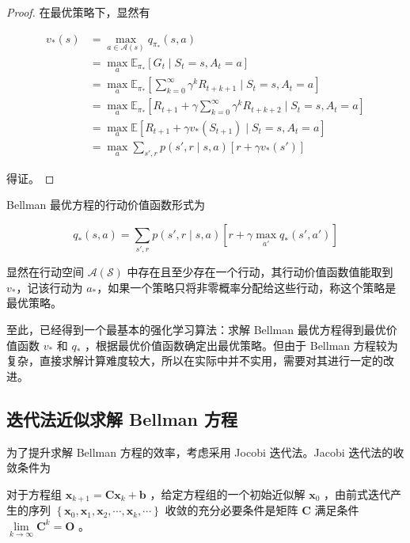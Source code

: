 \begin{proof}
    在最优策略下，显然有

     \[
    \begin{aligned}v_*(s) &= \max_{a\in \mathcal A(s)}q_{\pi_*}(s,a) \\ &=\max_a \mathbb{E}_{\pi_*} \left[G_t \mid S_t=s, A_t=a \right] \\ &= \max_a \mathbb{E}_{\pi_*} \left[\sum_{k=0}^\infty \gamma^kR_{t+k+1} \mid S_t=s,A_t=a \right] \\ &= \max_a \mathbb{E}_{\pi_*} \left[R_{t+1}+\gamma \sum_{k=0}^\infty\gamma^kR_{t+k+2}\mid S_t=s,A_t=a \right] \\ &= \max_a \mathbb{E}[R_{t+1}+\gamma v_*(S_{t+1}) \mid S_t=s,A_t=a] \\ &=\max_{a}\sum_{s',r}p(s',r \mid s,a)[r+\gamma v_*(s')]\end{aligned}
    \]

    得证。
\end{proof}

Bellman 最优方程的行动价值函数形式为

\begin{equation}
    q_*(s,a) = \sum_{s',r}p(s',r \mid s,a)\left[r+\gamma \max_{a'}q_*(s',a') \right]
\end{equation}

\begin{Definition}
    显然在行动空间 $\mathcal{A}(\mathcal{S})$ 中存在且至少存在一个行动，其行动价值函数值能取到 $v_*$，记该行动为 $a_*$，如果一个策略只将非零概率分配给这些行动，称这个策略是最优策略。
\end{Definition}

至此，已经得到一个最基本的强化学习算法：求解 Bellman 最优方程得到最优价值函数 $v_*$ 和 $q_*$ ，根据最优价值函数确定出最优策略。但由于 Bellman 方程较为复杂，直接求解计算难度较大，所以在实际中并不实用，需要对其进行一定的改进。

\subsection{迭代法近似求解 Bellman 方程}

为了提升求解 Bellman 方程的效率，考虑采用 Jocobi 迭代法\cite{2007numanalysis}。Jacobi 迭代法的收敛条件为

\begin{Theorem}\label{the:jacobi}
    对于方程组 $\boldsymbol{x}_{k+1} = \boldsymbol{Cx}_{k}+\boldsymbol{b}$ ，给定方程组的一个初始近似解 $\boldsymbol{x}_0$ ，由前式迭代产生的序列 $\left\{\boldsymbol{x}_0,\boldsymbol{x}_1,\boldsymbol{x}_2,\cdots,\boldsymbol{x}_k,\cdots\right\}$ 收敛的充分必要条件是矩阵 $\boldsymbol{C}$ 满足条件 $\lim\limits_{k \rightarrow \infty} \boldsymbol{C}^{k}=\boldsymbol{O}$ 。
\end{Theorem}

